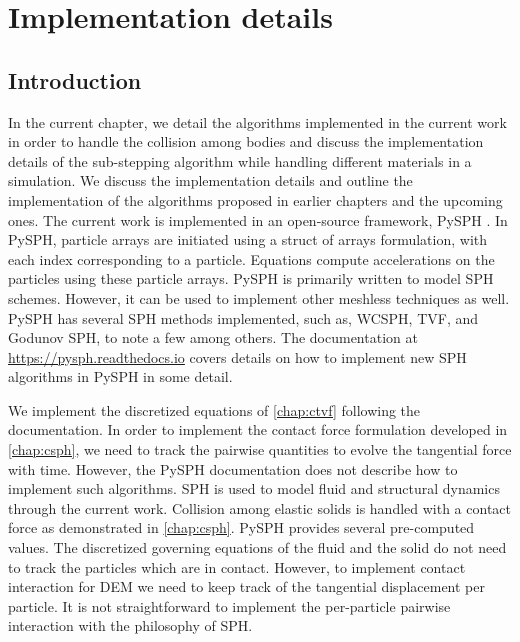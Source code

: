 \chapter{Implementation details}
\label{chap:implementation_detail}
\section{Introduction}
\label{sec:intro}

In the current chapter, we detail the algorithms implemented in the current work
in order to handle the collision among bodies and discuss the implementation
details of the sub-stepping algorithm while handling different materials in a
simulation. We discuss the implementation details and outline the implementation
of the algorithms proposed in earlier chapters and the upcoming ones. The
current work is implemented in an open-source framework, PySPH
\citep{pysph2020}. In PySPH, particle arrays are initiated using a struct of
arrays formulation, with each index corresponding to a particle. Equations
compute accelerations on the particles using these particle arrays. PySPH is
primarily written to model SPH schemes. However, it can be used to implement
other meshless techniques as well. PySPH has several SPH methods implemented,
such as, WCSPH, TVF, and Godunov SPH, to note a few among others. The
documentation at \url{https://pysph.readthedocs.io} covers details on how to
implement new SPH algorithms in PySPH in some detail.


We implement the discretized equations of \cref{chap:ctvf} following the
documentation. In order to implement the contact force formulation developed in
\cref{chap:csph}, we need to track the pairwise quantities to evolve the
tangential force with time. However, the PySPH documentation does not describe
how to implement such algorithms. SPH is used to model fluid and structural
dynamics through the current work. Collision among elastic solids is handled
with a contact force as demonstrated in \cref{chap:csph}. PySPH provides several
pre-computed values. The discretized governing equations of the fluid and the
solid do not need to track the particles which are in contact. However, to
implement contact interaction for DEM we need to keep track of the tangential
displacement per particle. It is not straightforward to implement the
per-particle pairwise interaction with the philosophy of SPH.


